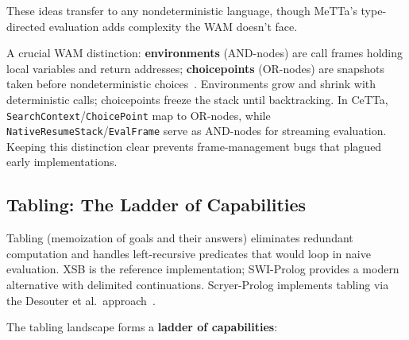 \documentclass[11pt]{article}
\newcommand{\code}[1]{\texttt{#1}}
\newcommand{\CeTTa}{\textup{CeTTa}}
\newcommand{\WAM}{\textup{WAM}}
\newcommand{\XSB}{\textup{XSB}}
\begin{document}
These ideas transfer to any nondeterministic language, though MeTTa's
type-directed evaluation adds complexity the \WAM{} doesn't face.

A crucial \WAM{} distinction: \textbf{environments} (AND-nodes) are call frames
holding local variables and return addresses; \textbf{choicepoints} (OR-nodes)
are snapshots taken before nondeterministic choices~\cite{Warren1983}.
Environments grow and shrink with deterministic calls; choicepoints freeze the
stack until backtracking.  In \CeTTa{}, \code{SearchContext}/\code{ChoicePoint}
map to OR-nodes, while \code{NativeResumeStack}/\code{EvalFrame} serve as
AND-nodes for streaming evaluation.  Keeping this distinction clear prevents
frame-management bugs that plagued early implementations.

\subsection{Tabling: The Ladder of Capabilities}

Tabling (memoization of goals and their answers) eliminates redundant
computation and handles left-recursive predicates that would loop in
naive evaluation.  \XSB{} is the reference implementation; SWI-Prolog
provides a modern alternative with delimited continuations.  Scryer-Prolog
implements tabling via the Desouter et al.\ approach~\cite{DesouterTabling2016}.

The tabling landscape forms a \textbf{ladder of capabilities}:
\end{document}
